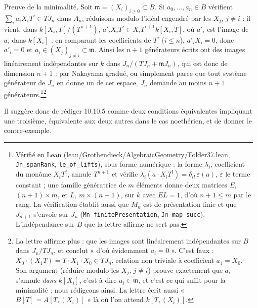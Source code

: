 \documentclass[11pt,a4paper]{article}
\begin{document}
Preuve de la minimalité. Soit $\mathfrak{m} = (X_i)_{i \ge 0} \subset B$. Si
$a_0, \ldots, a_n \in B$ vérifient
$\sum_i a_i X_i T^i \in T J_n$ dans $A_n$, réduisons modulo l'idéal engendré
par les $X_j$, $j \neq i$ : il vient, dans $k[X_i, T]/(T^{n+1})$,
$a'_i X_i T^i \in X_i T^{i+1} k[X_i, T]$, où $a'_i$ est l'image de $a_i$ dans
$k[X_i]$ ; en comparant les coefficients de $T^i$ ($i \le n$), $a'_i X_i = 0$,
donc $a'_i = 0$ et $a_i \in (X_j)_{j \neq i} \subset \mathfrak{m}$. Ainsi les
$n+1$ générateurs écrits ont des images linéairement indépendantes sur $k$
dans $J_n / (TJ_n + \mathfrak{m}J_n)$, qui est donc de dimension $n+1$ ; par
Nakayama gradué, ou simplement parce que tout système générateur de $J_n$ en
donne un de cet espace, $J_n$ demande au moins $n+1$
générateurs.\footnote{Vérifié en Lean (lean/Grothendieck/AlgebraicGeometry/Folder37.lean,
\texttt{Jn\_spanRank}, \texttt{le\_of\_lifts}), sous forme numérique : la forme
$\lambda_i$, coefficient du monôme $X_iT^i$, annule $T^{n+1}$ et vérifie
$\lambda_i(a \cdot X_lT^l) = \delta_{il}\,\varepsilon(a)$, $\varepsilon$ le
terme constant ; une famille génératrice de $m$ éléments donne deux matrices
$E$, $(n+1) \times m$, et $L$, $m \times (n+1)$, sur $k$ avec $EL = 1$, d'où
$n+1 \leqslant m$ par le rang. La vérification établit aussi que $M_n$ est de
présentation finie et que $J_{n+1}$ s'envoie sur $J_n$
(\texttt{Mn\_finitePresentation}, \texttt{Jn\_map\_succ}). L'indépendance sur
$B$ que la lettre affirme ne sert pas.}\footnote{La lettre affirme plus : que les images sont
linéairement indépendantes sur $B$ dans $J_n/TJ_n$, et conclut « d'où
évidemment $a_i = 0$ ». C'est faux : $X_0 \cdot (X_1 T) = T \cdot X_1 \cdot
X_0 \in TJ_n$, relation non triviale à coefficient $a_1 = X_0$. Son argument
(réduire modulo les $X_j$, $j \neq i$) prouve exactement que $a_i$ s'annule
\emph{dans} $k[X_i]$, c'est-à-dire $a_i \in \mathfrak{m}$, et c'est ce qui suffit
pour la minimalité ; nous rédigeons ainsi. La lettre écrit aussi
« $B[T] = A[T, (X_i)]$ » là où l'on attend $k[T, (X_i)]$.}

Il suggère donc de rédiger 10.10.5 comme deux conditions équivalentes
impliquant une troisième, équivalente aux deux autres dans le cas
noethérien, et de donner le contre-exemple.
\end{document}
